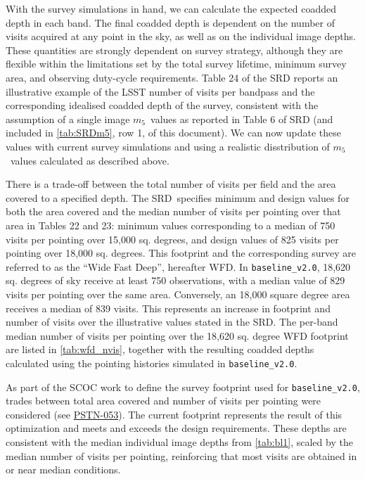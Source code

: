 \documentclass[PST,authoryear,toc]{lsstdoc}
\newcommand{\mf}{\ensuremath{m_5}}
\newcommand{\baseline}{\texttt{baseline\_v2.0}}
\begin{document}
With the survey simulations in hand, we can calculate the expected coadded depth in each band. The final coadded depth is dependent on the number of visits acquired at any point in the sky, as well as on the individual image depths. These quantities are strongly dependent on survey strategy, although they are flexible within the limitations set by the total survey lifetime, minimum survey area, and observing duty-cycle requirements. Table 24 of the SRD reports an illustrative example of the LSST number of visits per bandpass and the corresponding idealised coadded depth of the survey, consistent with the assumption of a single image \mf\ values as reported in Table 6 of SRD (and included in \autoref{tab:SRDm5}, row 1, of this document).  We can now update these values with current survey simulations and using a realistic disstribution of \mf\ values calculated as described above.

There is a trade-off between the total number of visits per field and the area covered to a specified depth.
The SRD\ specifies minimum and design values for both the area covered and the median number of visits per pointing over that area in Tables 22 and 23: minimum values corresponding to a median of 750 visits per pointing over 15,000 sq. degrees, and design values of 825 visits per pointing over 18,000 sq. degrees. This footprint and the corresponding survey are referred to as the ``Wide Fast Deep'', hereafter WFD. In  \baseline, 18,620 sq. degrees of sky receive at least 750 observations, with a median value of 829 visits per pointing over the same area.  Conversely, an 18,000 square degree area receives a median of 839 visits.
This represents an increase in footprint and number of visits over the illustrative values stated in the SRD. The per-band median number of visits per pointing over the 18,620 sq. degree WFD footprint are listed in \autoref{tab:wfd_nvis}, together with the resulting coadded depths calculated using the pointing histories simulated in \baseline.


  As part of the SCOC work to define the survey footprint used for \baseline, trades between total area covered and number of visits per pointing were considered (see \href{https://pstn-053.lsst.io}{{PSTN-053}}). The current footprint represents the result of this optimization and meets and exceeds the design requirements.
  These depths are consistent with the median individual image depths from \autoref{tab:bl1}, scaled by the median number of visits per pointing, reinforcing that most visits are obtained in or near median conditions.
\end{document}
